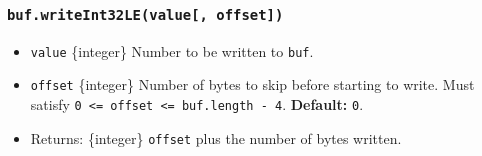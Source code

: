 \begin{Shaded}
\begin{Highlighting}[]
\NormalTok{ \{ }\NormalTok{ \} } \OperatorTok{;}

\OperatorTok{=} \NormalTok{(}\NormalTok{)}\OperatorTok{;}

\NormalTok{(}\OperatorTok{,} \NormalTok{)}\OperatorTok{;}

\OperatorTok{;}
\end{Highlighting}
\end{Shaded}

\begin{Shaded}
\begin{Highlighting}[]
\NormalTok{ \{ }\NormalTok{ \} }\OperatorTok{=} \NormalTok{(}\NormalTok{)}\OperatorTok{;}

\OperatorTok{=} \NormalTok{(}\NormalTok{)}\OperatorTok{;}

\NormalTok{(}\OperatorTok{,} \NormalTok{)}\OperatorTok{;}

\OperatorTok{;}
\end{Highlighting}
\end{Shaded}

\subsubsection{\texorpdfstring{\texttt{buf.writeInt32LE(value{[},\ offset{]})}}{buf.writeInt32LE(value{[}, offset{]})}}\label{buf.writeint32levalue-offset}

\begin{itemize}
\tightlist
\item
  \texttt{value} \{integer\} Number to be written to \texttt{buf}.
\item
  \texttt{offset} \{integer\} Number of bytes to skip before starting to
  write. Must satisfy
  \texttt{0\ \textless{}=\ offset\ \textless{}=\ buf.length\ -\ 4}.
  \textbf{Default:} \texttt{0}.
\item
  Returns: \{integer\} \texttt{offset} plus the number of bytes written.
\end{itemize}


